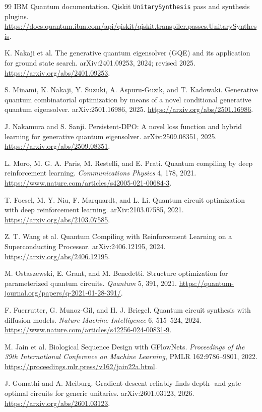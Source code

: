 \documentclass[11pt]{article}
\begin{document}
\begin{thebibliography}{99}
IBM Quantum documentation.
\newblock Qiskit \texttt{UnitarySynthesis} pass and synthesis plugins.
\newblock \url{https://docs.quantum.ibm.com/api/qiskit/qiskit.transpiler.passes.UnitarySynthesis}.

K. Nakaji et al.
\newblock The generative quantum eigensolver (GQE) and its application for
ground state search.
\newblock arXiv:2401.09253, 2024; revised 2025.
\newblock \url{https://arxiv.org/abs/2401.09253}.

S. Minami, K. Nakaji, Y. Suzuki, A. Aspuru-Guzik, and T. Kadowaki.
\newblock Generative quantum combinatorial optimization by means of a novel
conditional generative quantum eigensolver.
\newblock arXiv:2501.16986, 2025.
\newblock \url{https://arxiv.org/abs/2501.16986}.

J. Nakamura and S. Sanji.
\newblock Persistent-DPO: A novel loss function and hybrid learning for
generative quantum eigensolver.
\newblock arXiv:2509.08351, 2025.
\newblock \url{https://arxiv.org/abs/2509.08351}.

L. Moro, M. G. A. Paris, M. Restelli, and E. Prati.
\newblock Quantum compiling by deep reinforcement learning.
\newblock \emph{Communications Physics} 4, 178, 2021.
\newblock \url{https://www.nature.com/articles/s42005-021-00684-3}.

T. Foesel, M. Y. Niu, F. Marquardt, and L. Li.
\newblock Quantum circuit optimization with deep reinforcement learning.
\newblock arXiv:2103.07585, 2021.
\newblock \url{https://arxiv.org/abs/2103.07585}.

Z. T. Wang et al.
\newblock Quantum Compiling with Reinforcement Learning on a Superconducting
Processor.
\newblock arXiv:2406.12195, 2024.
\newblock \url{https://arxiv.org/abs/2406.12195}.

M. Ostaszewski, E. Grant, and M. Benedetti.
\newblock Structure optimization for parameterized quantum circuits.
\newblock \emph{Quantum} 5, 391, 2021.
\newblock \url{https://quantum-journal.org/papers/q-2021-01-28-391/}.

F. Fuerrutter, G. Munoz-Gil, and H. J. Briegel.
\newblock Quantum circuit synthesis with diffusion models.
\newblock \emph{Nature Machine Intelligence} 6, 515--524, 2024.
\newblock \url{https://www.nature.com/articles/s42256-024-00831-9}.

M. Jain et al.
\newblock Biological Sequence Design with GFlowNets.
\newblock \emph{Proceedings of the 39th International Conference on Machine
Learning}, PMLR 162:9786--9801, 2022.
\newblock \url{https://proceedings.mlr.press/v162/jain22a.html}.

J. Gomathi and A. Meiburg.
\newblock Gradient descent reliably finds depth- and gate-optimal circuits for
generic unitaries.
\newblock arXiv:2601.03123, 2026.
\newblock \url{https://arxiv.org/abs/2601.03123}.

\end{thebibliography}
\end{document}
